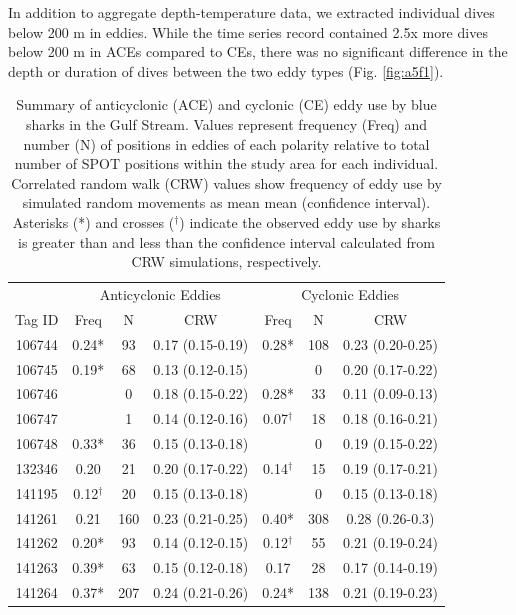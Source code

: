 In addition to aggregate depth-temperature data, we extracted individual dives below 200 m in eddies. While the time series record contained 2.5x more dives below 200 m in ACEs compared to CEs, there was no significant difference in the depth or duration of dives between the two eddy types (Fig. \ref{fig:a5f1}).

\begin{table}
\caption[Summary of anticyclonic and cyclonic eddy use by blue sharks in the Gulf Stream]{Summary of anticyclonic (ACE) and cyclonic (CE) eddy use by blue sharks in the Gulf Stream. Values represent frequency (Freq) and number (N) of positions in eddies of each polarity relative to total number of SPOT positions within the study area for each individual. Correlated random walk (CRW) values show frequency of eddy use by simulated random movements as mean mean (confidence interval). Asterisks (*) and crosses ($^{\dagger}$) indicate the observed eddy use by sharks is greater than and less than the confidence interval calculated from CRW simulations, respectively.}
\label{tab:c5t2}
\centering
\begin{tabular}[t]{ccccccc}
\toprule
 & \multicolumn{3}{c}{Anticyclonic Eddies} & \multicolumn{3}{c}{Cyclonic Eddies} \\
Tag ID & Freq & N & CRW & Freq & N & CRW\\
\midrule
106744 & 0.24* & 93 & 0.17 (0.15-0.19) & 0.28* & 108 & 0.23 (0.20-0.25)\\
106745 & 0.19* & 68 & 0.13 (0.12-0.15) &  & 0 & 0.20 (0.17-0.22)\\
106746 &  & 0 & 0.18 (0.15-0.22) & 0.28* & 33 & 0.11 (0.09-0.13)\\
106747 &  & 1 & 0.14 (0.12-0.16) & 0.07$^{\dagger}$ & 18 & 0.18 (0.16-0.21)\\
106748 & 0.33* & 36 & 0.15 (0.13-0.18) &  & 0 & 0.19 (0.15-0.22)\\
132346 & 0.20 & 21 & 0.20 (0.17-0.22) & 0.14$^{\dagger}$ & 15 & 0.19 (0.17-0.21)\\
141195 & 0.12$^{\dagger}$ & 20 & 0.15 (0.13-0.18) &  & 0 & 0.15 (0.13-0.18)\\
141261 & 0.21 & 160 & 0.23 (0.21-0.25) & 0.40* & 308 & 0.28 (0.26-0.3)\\
141262 & 0.20* & 93 & 0.14 (0.12-0.15) & 0.12$^{\dagger}$ & 55 & 0.21 (0.19-0.24)\\
141263 & 0.39* & 63 & 0.15 (0.12-0.18) & 0.17 & 28 & 0.17 (0.14-0.19)\\
141264 & 0.37* & 207 & 0.24 (0.21-0.26) & 0.24* & 138 & 0.21 (0.19-0.23)\\

\end{tabular}
\end{table}

